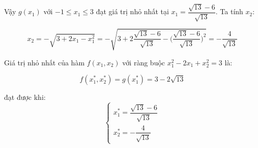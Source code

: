 \documentclass[14pt, a4paper]{article}
\theoremstyle{sltheorem}
\theoremstyle{soltheorem}
\begin{document}
    Vậy $g(x_1)$ với $-1 \leq x_1 \leq 3$ đạt giá trị nhỏ nhất tại $x_1 = \dfrac{\sqrt{13} - 6}{\sqrt{13}}$.
    Ta tính $x_2$:

    \begin{equation*}
        x_2 = - \sqrt{3 + 2x_1 - x_1^2}= -\sqrt{3 + 2 \dfrac{\sqrt{13} - 6}{\sqrt{13}} - \Big( \dfrac{\sqrt{13} - 6}{\sqrt{13}} \Big)^2} = -\dfrac{4}{\sqrt{13}}
    \end{equation*}

    Giá trị nhỏ nhất của hàm $f(x_1, x_2)$ với ràng buộc $x_1^2 - 2x_1 + x_2^2 = 3$ là:

    \begin{equation*}
        f(x_1^*, x_2^*) = g(x_1^{*}) = 3 - 2\sqrt{13}
    \end{equation*}

    đạt được khi:
    \begin{equation*}
        \begin{cases} 
            x_1^* = \dfrac{\sqrt{13} - 6}{\sqrt{13}} \\ 
            x_2^* = - \dfrac{4}{\sqrt{13}} 
        \end{cases}
    \end{equation*}

    \newpage
    \printbibliography[title={TÀI LIỆU THAM KHẢO}]
\end{document}

